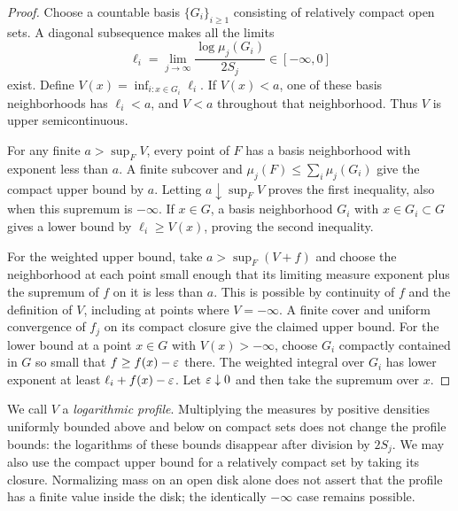 \begin{proof}
Choose a countable basis $\{G_i\}_{i\ge1}$ consisting of relatively
compact open sets.  A diagonal subsequence makes all the limits
\[
 \ell_i=\lim_{j\to\infty}\frac{\log\mu_j(G_i)}{2S_j}
        \in[-\infty,0]
\]
exist.  Define $V(x)=\inf_{i:x\in G_i}\ell_i$.  If $V(x)<a$, one of
these basis neighborhoods has $\ell_i<a$, and $V<a$ throughout that
neighborhood.  Thus $V$ is upper semicontinuous.

For any finite $a>\sup_F V$, every point of $F$ has a basis
neighborhood with exponent less than $a$.  A finite subcover and
$\mu_j(F)\le\sum_i\mu_j(G_i)$ give the compact upper bound by $a$.
Letting $a\downarrow\sup_F V$ proves the first inequality, also when
this supremum is $-\infty$.  If $x\in G$, a basis neighborhood
$G_i$ with $x\in G_i\subset G$ gives a lower bound by
$\ell_i\ge V(x)$, proving the second inequality.

For the weighted upper bound, take $a>\sup_F(V+f)$ and choose the
neighborhood at each point small enough that its limiting measure
exponent plus the supremum of $f$ on it is less than $a$.  This is
possible by continuity of $f$ and the definition of $V$, including
at points where $V=-\infty$.  A finite cover and uniform convergence
of $f_j$ on its compact closure give the claimed upper bound.  For
the lower bound at a point $x\in G$ with $V(x)>-\infty$, choose
$G_i$ compactly contained in $G$ so small that
$f\ge f(x)-\varepsilon$ there.  The weighted integral over $G_i$ has lower
exponent at least $\ell_i+f(x)-\varepsilon$.  Let $\varepsilon\downarrow0$ and
then take the supremum over $x$.
\end{proof}

We call $V$ a \emph{logarithmic profile}.  Multiplying the measures
by positive densities uniformly bounded above and below on compact
sets does not change the profile bounds: the logarithms of these
bounds disappear after division by $2S_j$.  We may also use the
compact upper bound for a relatively compact set by taking its
closure.  Normalizing mass on an open disk alone does not assert
that the profile has a finite value inside the disk; the
identically $-\infty$ case remains possible.

